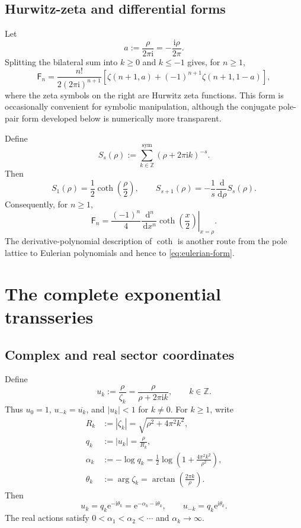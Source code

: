 \documentclass[11pt,a4paper,oneside]{article}
\theoremstyle{definition}
\theoremstyle{remark}
\newcommand{\Fub}{\mathsf{F}}
\newcommand{\e}{\mathrm{e}}
\newcommand{\ii}{\mathrm{i}}
\newcommand{\dd}{\,\mathrm{d}}
\begin{document}
\subsection{Hurwitz-zeta and differential forms}
Let
\[
 a:=\frac{\rho}{2\pi\ii}=-\frac{\ii\rho}{2\pi}.
\]
Splitting the bilateral sum into $k\ge0$ and $k\le-1$ gives, for $n\ge1$,
\begin{equation}\label{eq:hurwitz-form}
 \Fub_n=\frac{n!}{2(2\pi\ii)^{n+1}}
 \left[
  \zeta(n+1,a)+(-1)^{n+1}\zeta(n+1,1-a)
 \right],
\end{equation}
where the zeta symbols on the right are Hurwitz zeta functions.  This form is
occasionally convenient for symbolic manipulation, although the conjugate
pole-pair form developed below is numerically more transparent.

Define
\[
 S_s(\rho):=\sum_{k\in\mathbb Z}^{\mathrm{sym}}
             (\rho+2\pi\ii k)^{-s}.
\]
Then
\[
 S_1(\rho)=\frac12\coth\!\left(\frac\rho2\right),
 \qquad
 S_{s+1}(\rho)=-\frac1s\frac{\dd}{\dd\rho}S_s(\rho).
\]
Consequently, for $n\ge1$,
\begin{equation}\label{eq:coth-derivative}
 \Fub_n=\frac{(-1)^n}{4}
 \left.\frac{\dd^n}{\dd x^n}\coth\!\left(\frac x2\right)
 \right|_{x=\rho}.
\end{equation}
The derivative-polynomial description of $\coth$ is another route from the
pole lattice to Eulerian polynomials and hence to \cref{eq:eulerian-form}.

\section{The complete exponential transseries}\label{sec:exp-transseries}

\subsection{Complex and real sector coordinates}
Define
\begin{equation}\label{eq:u-def}
 u_k:=\frac{\rho}{\zeta_k}
 =\frac{\rho}{\rho+2\pi\ii k},
 \qquad k\in\mathbb Z.
\end{equation}
Thus $u_0=1$, $u_{-k}=\overline{u_k}$, and $|u_k|<1$ for $k\ne0$.
For $k\ge1$, write
\begin{align}
 R_k&:=|\zeta_k|=\sqrt{\rho^2+4\pi^2k^2},\label{eq:Rk}\\
 q_k&:=|u_k|=\frac{\rho}{R_k},\label{eq:qk}\\
 \alpha_k&:=-\log q_k
 =\frac12\log\!\left(1+\frac{4\pi^2k^2}{\rho^2}\right),\label{eq:alphak}\\
 \theta_k&:=\arg\zeta_k=\arctan\!\left(\frac{2\pi k}{\rho}\right).
 \label{eq:thetak}
\end{align}
Then
\[
 u_k=q_k\e^{-\ii\theta_k}
     =\e^{-\alpha_k-\ii\theta_k},
 \qquad
 u_{-k}=q_k\e^{\ii\theta_k}.
\]
The real actions satisfy
\(
 0<\alpha_1<\alpha_2<\cdots
\) and $\alpha_k\to\infty$.
\end{document}

